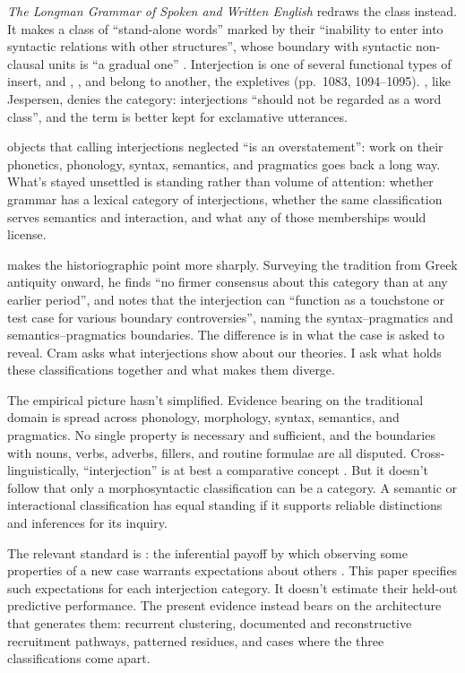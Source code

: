 \documentclass[12pt]{article}
\begin{document}
\textit{The Longman Grammar of Spoken and Written English} redraws the class
instead. It makes  a class of \enquote{stand-alone words} marked
by their \enquote{inability to enter into syntactic relations with other
structures}, whose boundary with syntactic non-clausal units is
\enquote{a gradual one} \citep[1082]{Biber1999}. Interjection is one of several
functional types of insert, and , , and
 belong to another, the expletives (pp.~1083, 1094--1095).
\textcite[81, 83]{ljung2011}, like Jespersen, denies the category: interjections
\enquote{should not be regarded as a word class}, and the term is better kept
for exclamative utterances.

\textcite{libert2019} objects that calling interjections neglected
\enquote{is an overstatement}: work on their phonetics, phonology, syntax,
semantics, and pragmatics goes back a long way. What's stayed
unsettled is standing rather than volume of attention: whether grammar has a
lexical category of interjections, whether the same classification serves
semantics and interaction, and what any of those memberships would license.

\textcite[63]{cram2008} makes the historiographic point more sharply.
Surveying the tradition from Greek antiquity onward, he finds \enquote{no
firmer consensus about this category than at any earlier period}, and notes
that the interjection can \enquote{function as a touchstone or test case for various
boundary controversies}, naming the syntax--pragmatics and
semantics--pragmatics boundaries. The difference is in what the case is asked
to reveal.
Cram asks what interjections show about our theories. I ask what holds these
classifications together and what makes them diverge.

The empirical picture hasn't simplified. Evidence bearing on the traditional
domain is spread across phonology, morphology, syntax, semantics, and
pragmatics. No single property is necessary and sufficient, and the
boundaries with nouns, verbs, adverbs, fillers, and routine formulae are all
disputed. Cross-linguistically, \enquote{interjection} is at best a
comparative concept \citep{haspelmath2010}. But it doesn't follow that only a
morphosyntactic classification can be a category. A semantic or interactional
classification has equal standing if it supports reliable distinctions and
inferences for its inquiry.

The relevant standard is : the inferential payoff by
which observing some properties of a new case warrants expectations about
others \citep{Goodman1955}. This paper specifies such expectations for each
interjection category. It doesn't estimate their held-out predictive
performance. The present evidence instead bears on the architecture that
generates them: recurrent clustering, documented and reconstructive
recruitment pathways, patterned residues, and cases where the three
classifications come apart.
\end{document}
